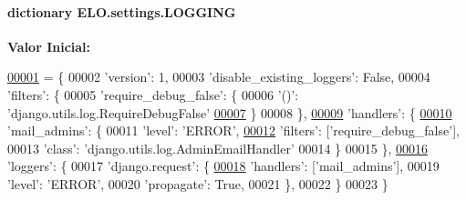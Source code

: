 \paragraph[{L\+O\+G\+G\+I\+N\+G}]{\setlength{\rightskip}{0pt plus 5cm}dictionary E\+L\+O.\+settings.\+L\+O\+G\+G\+I\+N\+G}\label{namespaceELO_1_1settings_addc421e02af1569796e2d33b2bc62ff5}
{\bfseries Valor Inicial\+:}
\begin{DoxyCode}
\hypertarget{namespaceELO_1_1settings_l00001}{}\hyperlink{namespaceELO_1_1settings}{00001} = \{
00002     \textcolor{stringliteral}{'version'}: 1,
00003     \textcolor{stringliteral}{'disable\_existing\_loggers'}: \textcolor{keyword}{False},
00004     \textcolor{stringliteral}{'filters'}: \{
00005         \textcolor{stringliteral}{'require\_debug\_false'}: \{
00006             \textcolor{stringliteral}{'()'}: \textcolor{stringliteral}{'django.utils.log.RequireDebugFalse'}
\hypertarget{namespaceELO_1_1settings_l00007}{}\hyperlink{namespaceELO_1_1settings_a7730264ddd478343e0f282f36d4a5ab4}{00007}         \}
00008     \},
\hypertarget{namespaceELO_1_1settings_l00009}{}\hyperlink{namespaceELO_1_1settings_a62f457ac29cc6f3e85282c71ce3b4f26}{00009}     \textcolor{stringliteral}{'handlers'}: \{
\hypertarget{namespaceELO_1_1settings_l00010}{}\hyperlink{namespaceELO_1_1settings_a014930e0bf77feccc65c20212593381e}{00010}         \textcolor{stringliteral}{'mail\_admins'}: \{
00011             \textcolor{stringliteral}{'level'}: \textcolor{stringliteral}{'ERROR'},
\hypertarget{namespaceELO_1_1settings_l00012}{}\hyperlink{namespaceELO_1_1settings_a051220bd8105ba13b2720df11c1950ba}{00012}             \textcolor{stringliteral}{'filters'}: [\textcolor{stringliteral}{'require\_debug\_false'}],
00013             \textcolor{stringliteral}{'class'}: \textcolor{stringliteral}{'django.utils.log.AdminEmailHandler'}
00014         \}
00015     \},
\hypertarget{namespaceELO_1_1settings_l00016}{}\hyperlink{namespaceELO_1_1settings_a43e8826e0b24e337065b4975f3eace4c}{00016}     \textcolor{stringliteral}{'loggers'}: \{
00017         \textcolor{stringliteral}{'django.request'}: \{
\hypertarget{namespaceELO_1_1settings_l00018}{}\hyperlink{namespaceELO_1_1settings_a91ed1425b7f1cf041960832ce5b54b6e}{00018}             \textcolor{stringliteral}{'handlers'}: [\textcolor{stringliteral}{'mail\_admins'}],
00019             \textcolor{stringliteral}{'level'}: \textcolor{stringliteral}{'ERROR'},
00020             \textcolor{stringliteral}{'propagate'}: \textcolor{keyword}{True},
00021         \},
00022     \}
00023 \}
\end{DoxyCode}


